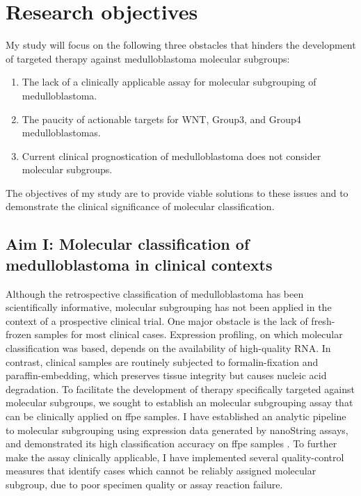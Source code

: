 \section{Research objectives}

My study will focus on the following three obstacles that hinders the development of targeted therapy against medulloblastoma molecular subgroups:

\begin{enumerate}
	\item The lack of a clinically applicable assay for molecular subgrouping of medulloblastoma.
	\item The paucity of actionable targets for WNT, Group3, and Group4 medulloblastomas.
	\item Current clinical prognostication of medulloblastoma does not consider molecular subgroups.
\end{enumerate}

The objectives of my study are to provide viable solutions to these issues and to demonstrate the clinical significance of molecular classification.


\subsection*{Aim I: Molecular classification of medulloblastoma in clinical contexts}

Although the retrospective classification of medulloblastoma has been scientifically informative, molecular subgrouping has not been applied in the context of a prospective clinical trial. One major obstacle is the lack of fresh-frozen samples for most clinical cases. Expression profiling, on which molecular classification was based, depends on the availability of high-quality RNA. In contrast, clinical samples are routinely subjected to formalin-fixation and paraffin-embedding, which preserves tissue integrity but causes nucleic acid degradation. To facilitate the development of therapy specifically targeted against molecular subgroups, we sought to establish an molecular subgrouping assay that can be clinically applied on \gls{ffpe} samples. I have established an analytic pipeline to molecular subgrouping using expression data generated by nanoString assays, and demonstrated its high classification accuracy on \gls{ffpe} samples . To further make the assay clinically applicable, I have implemented several quality-control measures that identify cases which cannot be reliably assigned molecular subgroup, due to poor specimen quality or assay reaction failure.

